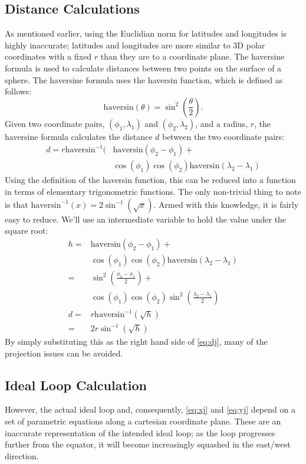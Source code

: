 \documentclass[twocolumn,11pt]{article}
\begin{document}
\subsection{Distance Calculations}
As mentioned earlier, using the Euclidian norm for latitudes and longitudes
is highly inaccurate; latitudes and longitudes are more similar to 3D polar
coordinates with a fixed $r$ than they are to a coordinate plane. The
haversine formula is used to calculate distances between two points on the
surface of a sphere. The haversine formula uses the haversin function,
which is defined as follows:
\newcommand{\haversin}{\mbox{haversin}}
\[ \haversin (\theta) = \sin^2(\frac{\theta}{2}). \]
Given two coordinate pairs, $(\phi_1, \lambda_1)$ and $(\phi_2, \lambda_2)$,
and a radius, $r$, the haversine formula calculates the distance $d$ between
the two coordinate pairs:
\begin{align*}
  d = r\haversin^{-1}(&\haversin(\phi_2 - \phi_1) + \\
  & \cos(\phi_1)\cos(\phi_2)\haversin(\lambda_2 -\lambda_1)
\end{align*}
Using the definition of the haversin function, this can be reduced into a
function in terms of elementary trigonometric functions. The only non-trivial
thing to note is that $\haversin^{-1}(x) = 2\sin^{-1}(\sqrt{x})$. Armed with
this knowledge, it is fairly easy to reduce. We'll use an intermediate variable
to hold the value under the square root:
\begin{align*}
  h = & \haversin(\phi_2-\phi_1) + \\
  & \cos(\phi_1)\cos(\phi_2)\haversin(\lambda_2-\lambda_1) \\
  = & \sin^2\left(\frac{\phi_2 - \phi_1}{2}\right) + \\
  & \cos(\phi_1)\cos(\phi_2)\sin^2\left(\frac{\lambda_2-\lambda_1}{2}\right)\\
  d = & r\haversin^{-1}\left(\sqrt{h}\right) \\
  = & 2r\sin^{-1}\left(\sqrt{h}\right)
\end{align*}
By simply substituting this as the right hand side of \eqref{eq:dj}, many of the
projection issues can be avoided.

\subsection{Ideal Loop Calculation}

However, the actual ideal loop and, consequently,
\eqref{eq:xj} and \eqref{eq:yj} depend on a set of parametric equations along
a cartesian coordinate plane. These are an inaccurate representation of the
intended ideal loop; as the loop progresses further from the equator, it will
become increasingly squashed in the east/west direction.
\end{document}
